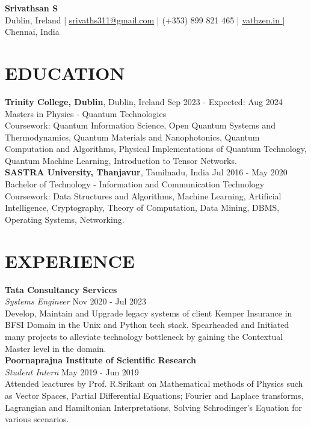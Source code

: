 \documentclass[a4paper,9pt]{extarticle}
\begin{document}
\pagestyle{empty}

\begin{center}
    \textbf{\Large Srivathsan S}\\[2pt]
    Dublin, Ireland | \href{mailto:srivaths311@gmail.com}{srivaths311@gmail.com} | (+353) 899 821 465 | \href{https://www.vathzen.in}{vathzen.in \faExternalLink} | Chennai, India 
\end{center}

\section*{EDUCATION}
\noindent
\textbf{Trinity College, Dublin}, Dublin, Ireland \hfill Sep 2023 - Expected: Aug 2024\\[1pt] 
Masters in Physics - Quantum Technologies\\[1pt]
Coursework: Quantum Information Science, Open Quantum Systems and Thermodynamics, Quantum Materials and Nanophotonics, Quantum Computation and
Algorithms, Physical Implementations of Quantum Technology, Quantum Machine Learning, Introduction to Tensor Networks.\\[1pt]

\noindent
\textbf{SASTRA University, Thanjavur}, Tamilnadu, India \hfill Jul 2016 - May 2020\\[1pt] 
Bachelor of Technology - Information and Communication Technology\\[1pt]
Coursework: Data Structures and Algorithms, Machine Learning, Artificial Intelligence, Cryptography, Theory of Computation, Data Mining,
DBMS, Operating Systems, Networking.

\section*{EXPERIENCE}
\noindent
\textbf{Tata Consultancy Services}\\[1pt]
\textit{Systems Engineer} \hfill Nov 2020 - Jul 2023\\[1pt]
Develop, Maintain and Upgrade legacy systems of client Kemper Insurance in BFSI Domain in the Unix and Python tech stack.
Spearheaded and Initiated many projects to alleviate technology bottleneck by gaining the Contextual Master level in the
domain.\\

\noindent
\textbf{Poornaprajna Institute of Scientific Research}\\[1pt]
\textit{Student Intern} \hfill May 2019 - Jun 2019\\[1pt]
Attended leactures by Prof. R.Srikant on Mathematical methods of Physics such as Vector Spaces, Partial Differential Equations; Fourier and Laplace transforms, Lagrangian and Hamiltonian Interpretations, Solving Schrodinger’s
Equation for various scenarios.
\end{document}
